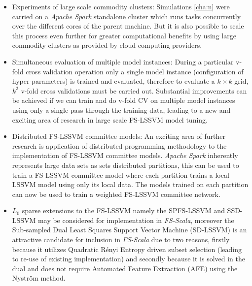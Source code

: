\begin{itemize}
\item Experiments of large scale commodity clusters:
Simulations \ref{cha:n} were carried on a \emph{Apache Spark} standalone cluster which runs tasks concurrently over the different cores of the parent machine. But it is also possible to scale this process even further for greater computational benefits by using large commodity clusters as provided by cloud computing providers.

\item Simultaneous evaluation of multiple model instances:
During a particular v-fold cross validation operation only a single model instance (configuration of hyper-parameters) is trained and  evaluated, therefore to evaluate a $k \times k$ grid, $k^2$ v-fold cross validations must be carried out. Substantial improvements can be achieved if we can train and do v-fold CV on multiple model instances using only a single pass through the training data, leading to a new and exciting area of research in large scale FS-LSSVM model tuning.

\item Distributed FS-LSSVM committee models:
An exciting area of further research is application of distributed programming methodology to the implementation of FS-LSSVM committee models. \emph{Apache Spark} inherently represents large data sets as sets distributed partitions, this can be used to train a FS-LSSVM committee model where each partition trains a local LSSVM model using only its local data. The models trained on each partition can now be used to train a weighted FS-LSSVM committee network.

\item $L_0$ sparse extensions \cite{Mall2015,Mall2013} to the FS-LSSVM namely the SPFS-LSSVM and SSD-LSSVM may be considered for implementation in \emph{FS-Scala}, moreover the Sub-sampled Dual Least Squares Support Vector Machine (SD-LSSVM) is an attractive candidate for inclusion in \emph{FS-Scala} due to two reasons, firstly because it utilizes Quadratic R\'enyi Entropy driven subset selection (leading to re-use of existing implementation) and secondly because it is solved in the dual and does not require Automated Feature Extraction (AFE) using the Nystr\"om method. 
\end{itemize}